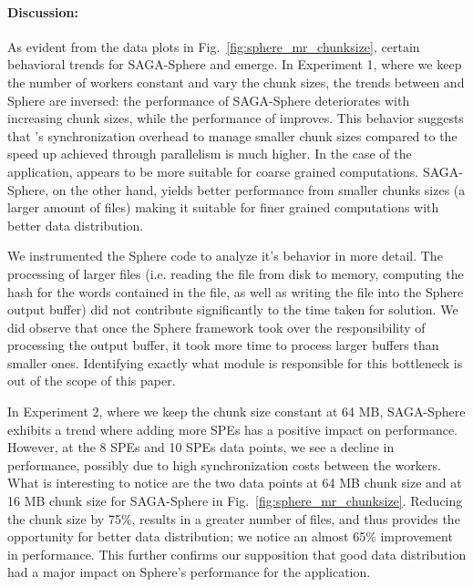 \documentclass[3p,twocolumn]{elsarticle}
\begin{document}
\paragraph{Discussion:}
As evident from the data plots in Fig.~\ref{fig:sphere_mr_chunksize},
certain behavioral trends for SAGA-Sphere and \sagamapreduce emerge.
In Experiment 1, where we keep the number of workers constant and vary
the chunk sizes, the trends between \sagamapreduce and Sphere are
inversed: the performance of SAGA-Sphere deteriorates with increasing
chunk sizes, while the performance of \sagamapreduce improves. This
behavior suggests that \sagamapreduce's synchronization overhead to
manage smaller chunk sizes compared to the speed up achieved through
parallelism is much higher.  In the case of the \wc application,
\sagamapreduce appears to be more suitable for coarse grained
computations. SAGA-Sphere, on the other hand, yields better
performance from smaller chunks sizes (a larger amount of files)
making it suitable for finer grained computations with better data
distribution.

We instrumented the Sphere code to analyze it's behavior in more detail.
The processing of larger files (i.e. reading the file from disk to memory,
computing the hash for the words contained in the file, as
well as writing the file into the Sphere output buffer) did not
contribute significantly to the time taken for solution. We did
observe that once the Sphere framework took over the responsibility
of processing the output buffer, it took more time to process larger
buffers than smaller ones. Identifying exactly what module is
responsible for this bottleneck is out of the scope of this paper.

In Experiment 2, where we keep the chunk size constant at 64 MB,
SAGA-Sphere exhibits a trend where adding more SPEs has a positive
impact on performance. However, at the 8 SPEs and 10 SPEs data points,
we see a decline in performance, possibly due to high synchronization
costs between the workers.  What is interesting to notice are the two
data points at 64 MB chunk size and at 16 MB chunk size for
SAGA-Sphere in Fig.~\ref{fig:sphere_mr_chunksize}.  Reducing the chunk
size by 75\%, results in a greater number of files, and thus provides
the opportunity for better data distribution; we notice an almost 65\%
improvement in performance. This further confirms our supposition that
good data distribution had a major impact on Sphere's performance for
the \wc application. 
\end{document}
